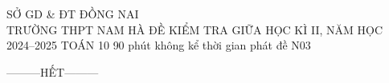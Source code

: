 \ExamMode
\ExamInfo
    {SỞ GD \& ĐT ĐỒNG NAI\\TRƯỜNG THPT NAM HÀ}
    {ĐỀ KIỂM TRA GIỮA HỌC KÌ II, NĂM HỌC 2024--2025}
    {TOÁN 10}
    {90 phút}
    {không kể thời gian phát đề}
    {N03}
\ShowHeaderQR

\MakeExamHeader





\begin{center}
---------HẾT---------
\end{center}
